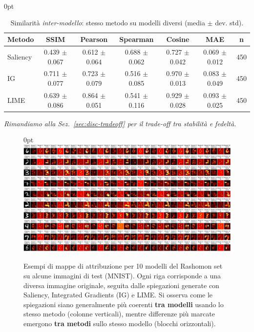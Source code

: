\documentclass[12pt,a4paper,oneside]{report}
\numberwithin{figure}{chapter}
\numberwithin{table}{chapter}
\newenvironment{tabindent}[1][\parindent]{%
  \begin{table}[H]\begin{adjustwidth}{#1}{0pt}\centering}{%
  \end{adjustwidth}\end{table}}
\newenvironment{figindent}[1][\parindent]{%
  \begin{figure}[H]\begin{adjustwidth}{#1}{0pt}\centering}{%
  \end{adjustwidth}\end{figure}}
\begin{document}
\vspace{-0.3\baselineskip}

\begin{tabindent}
      \renewcommand{\arraystretch}{1.1}
      \begin{adjustbox}{max width=\linewidth}
            \begin{tabular}{lccccc c}
                  \hline
                  \textbf{Metodo} & \textbf{SSIM}     & \textbf{Pearson}  & \textbf{Spearman} & \textbf{Cosine}   & \textbf{MAE}      & \textbf{n} \\
                  \hline
                  Saliency        & 0.439 $\pm$ 0.067 & 0.612 $\pm$ 0.064 & 0.688 $\pm$ 0.062 & 0.727 $\pm$ 0.042 & 0.069 $\pm$ 0.012 & 450        \\
                  IG              & 0.711 $\pm$ 0.077 & 0.723 $\pm$ 0.079 & 0.516 $\pm$ 0.085 & 0.970 $\pm$ 0.013 & 0.083 $\pm$ 0.049 & 450        \\
                  LIME            & 0.639 $\pm$ 0.086 & 0.864 $\pm$ 0.051 & 0.541 $\pm$ 0.116 & 0.929 $\pm$ 0.028 & 0.093 $\pm$ 0.025 & 450        \\
                  \hline
            \end{tabular}
      \end{adjustbox}
      \caption{Similarità \emph{inter-modello}: stesso metodo su modelli diversi (media $\pm$ dev. std).}
      \label{tab:sim_inter}
\end{tabindent}

{\small \textit{Rimandiamo alla Sez.~\ref{sec:disc-tradeoff} per il trade-off tra stabilità e fedeltà.}}


\begin{figindent}
      \centering
      \includegraphics[width=\textwidth]{images/visualizzazione (2).png}
      \caption{Esempi di mappe di attribuzione per 10 modelli del Rashomon set su alcune immagini di test (MNIST).
            Ogni riga corrisponde a una diversa immagine originale, seguita dalle spiegazioni generate con Saliency, Integrated Gradients (IG) e LIME.
            Si osserva come le spiegazioni siano generalmente più coerenti \textbf{tra modelli} usando lo stesso metodo (colonne verticali),
            mentre differenze più marcate emergono \textbf{tra metodi} sullo stesso modello (blocchi orizzontali).}
      \label{fig:similarity_examples}
\end{figindent}
\end{document}
